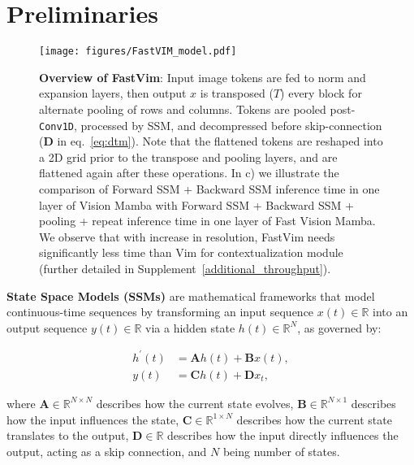 \section{Preliminaries}
\label{sec:preliminaries}


\begin{figure*}[t]
\centering
    \texttt{[image: figures/FastVIM\_model.pdf]} 
    \caption{\textbf{Overview of FastVim}: Input image tokens are fed to norm and expansion layers, then output $x$ is transposed ($T$) every block for alternate pooling of rows and columns. Tokens are pooled post-\texttt{Conv1D}, processed by SSM, and decompressed before skip-connection ($\mathbf{D}$ in eq.~\ref{eq:dtm}). Note that the flattened tokens are reshaped into a 2D grid prior to the transpose and pooling layers, and are flattened again after these operations. In c) we illustrate the comparison of Forward SSM + Backward SSM inference time in one layer of Vision Mamba with Forward SSM + Backward SSM + pooling + repeat inference time in one layer of Fast Vision Mamba. We observe that with increase in resolution, FastVim needs significantly less time than Vim for contextualization module (further detailed in Supplement~\ref{additional_throughput}).}
    \vspace{- 4pt}
    \label{fig:model}
\end{figure*}


\textbf{State Space Models (SSMs)} are mathematical frameworks that model continuous-time sequences by transforming an input sequence $x(t) \in \mathbb{R}$ into an output sequence $y(t) \in \mathbb{R}$ via a hidden state $h(t) \in \mathbb{R}^N$, as governed by:

\begin{equation}
\begin{aligned}
h^{'}(t) &= \mathbf{A} h(t) + \mathbf{B} x(t), \\
y(t) &= \mathbf{C} h(t) + \mathbf{D} x_t,
\end{aligned}
\label{eq:ctm}
\end{equation}

where $\mathbf{A} \in \mathbb{R}^{N \times N}$ describes how the current state evolves, $\mathbf{B} \in \mathbb{R}^{N \times 1}$ describes how the input influences the state, $\mathbf{C} \in \mathbb{R}^{1 \times N}$ describes how the current state translates to the output, $\mathbf{D} \in \mathbb{R}$ describes how the input directly influences the output, acting as a skip connection, and $N$ being number of states.

